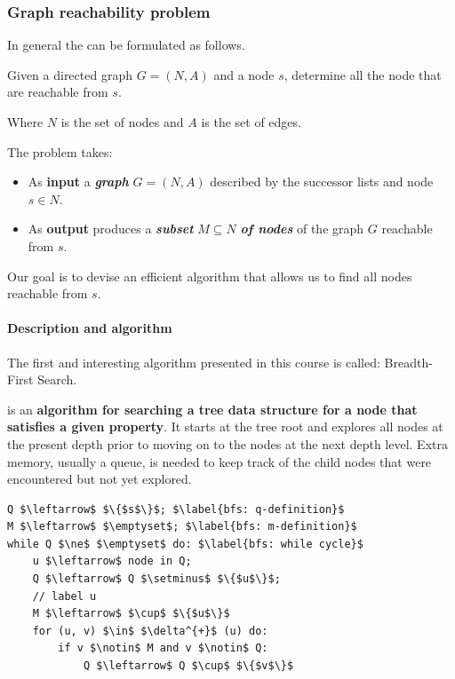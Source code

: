 \newpage

\subsubsection{Graph reachability problem}

In general the  can be formulated as follows.

\begin{definitionbox}
    Given a directed graph $G = \left(N,A\right)$ and a node $s$, determine all the node that are reachable from $s$.
\end{definitionbox}

\noindent
Where $N$ is the set of nodes and $A$ is the set of edges.

\highspace
The problem takes:
\begin{itemize}
    \item As \textbf{input} a \emph{\textbf{graph}} $G = \left(N,A\right)$ described by the successor lists and node $s \in N$.
    
    \item As \textbf{output} produces a \emph{\textbf{subset}} $M \subseteq N$ \emph{\textbf{of nodes}} of the graph $G$ reachable from $s$.
\end{itemize}
Our goal is to devise an efficient algorithm that allows us to find all nodes reachable from $s$.

\longline

\paragraph{Description and algorithm}

The first and interesting algorithm presented in this course is called: Breadth-First Search.

\begin{definitionbox}
     is an \textbf{algorithm for searching a tree data structure for a node that satisfies a given property}. It starts at the tree root and explores all nodes at the present depth prior to moving on to the nodes at the next depth level. Extra memory, usually a queue, is needed to keep track of the child nodes that were encountered but not yet explored.
\end{definitionbox}

\begin{lstlisting}[language=pseudo-code, caption={Graph reachability problem: Breadth-First Search}]
Q $\leftarrow$ $\{$s$\}$; $\label{bfs: q-definition}$
M $\leftarrow$ $\emptyset$; $\label{bfs: m-definition}$
while Q $\ne$ $\emptyset$ do: $\label{bfs: while cycle}$
    u $\leftarrow$ node in Q;
    Q $\leftarrow$ Q $\setminus$ $\{$u$\}$;
    // label u
    M $\leftarrow$ $\cup$ $\{$u$\}$
    for (u, v) $\in$ $\delta^{+}$ (u) do:
        if v $\notin$ M and v $\notin$ Q:
            Q $\leftarrow$ Q $\cup$ $\{$v$\}$
\end{lstlisting}

